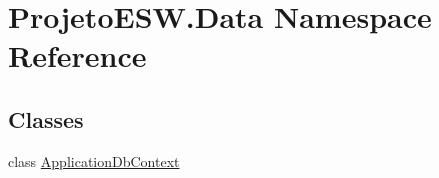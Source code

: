 \hypertarget{namespace_projeto_e_s_w_1_1_data}{}\section{Projeto\+E\+S\+W.\+Data Namespace Reference}
\label{namespace_projeto_e_s_w_1_1_data}
\subsection*{Classes}
\begin{DoxyCompactItemize}
\item 
class \mbox{\hyperlink{class_projeto_e_s_w_1_1_data_1_1_application_db_context}{Application\+Db\+Context}}
\end{DoxyCompactItemize}
